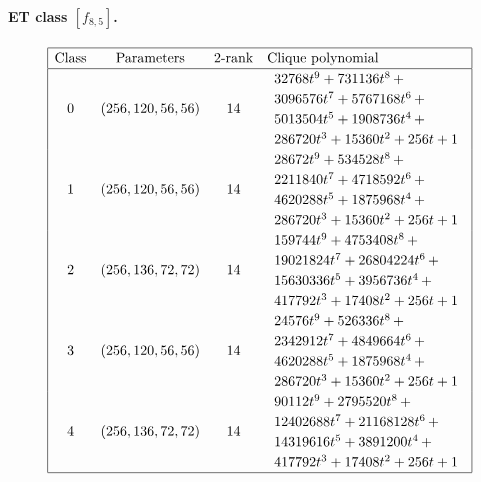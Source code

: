 \documentclass[12pt,a4paper]{article}
\begin{document}
\paragraph*{ET class $[f_{8,5}]$.}
%
\begin{table}[!bhpt] %
\small{}
\begin{align*}
\def\arraystretch{1.2}
\begin{array}{|cccl|}
\hline
\text{Class} &
\text{Parameters} &
\text{2-rank} &
\text{Clique polynomial}
\\
\hline
0 &
(256, 120, 56, 56) &
14 &
\begin{array}{l}
32768t^{9} + 731136t^{8}
\,+
\\
 3096576t^{7} + 5767168t^{6}
\,+
\\
 5013504t^{5} + 1908736t^{4}
\,+
\\
 286720t^{3} + 15360t^{2} + 256t + 1
\end{array}
\\
1 &
(256, 120, 56, 56) &
14 &
\begin{array}{l}
28672t^{9} + 534528t^{8}
\,+
\\
 2211840t^{7} + 4718592t^{6}
\,+
\\
 4620288t^{5} + 1875968t^{4}
\,+
\\
 286720t^{3} + 15360t^{2} + 256t + 1
\end{array}
\\
2 &
(256, 136, 72, 72) &
14 &
\begin{array}{l}
159744t^{9} + 4753408t^{8}
\,+
\\
 19021824t^{7} + 26804224t^{6}
\,+
\\
 15630336t^{5} + 3956736t^{4}
\,+
\\
 417792t^{3} + 17408t^{2} + 256t + 1
\end{array}
\\
3 &
(256, 120, 56, 56) &
14 &
\begin{array}{l}
24576t^{9} + 526336t^{8}
\,+
\\
 2342912t^{7} + 4849664t^{6}
\,+
\\
 4620288t^{5} + 1875968t^{4}
\,+
\\
 286720t^{3} + 15360t^{2} + 256t + 1
\end{array}
\\
4 &
(256, 136, 72, 72) &
14 &
\begin{array}{l}
90112t^{9} + 2795520t^{8}
\,+
\\
 12402688t^{7} + 21168128t^{6}
\,+
\\
 14319616t^{5} + 3891200t^{4}
\,+
\\
 417792t^{3} + 17408t^{2} + 256t + 1
\end{array}
\\
\hline
\end{array}
\end{align*}
\caption{$f_{8,5}$ extended Cayley classes (part 1)}
\label{tab-c8_5_EC_classes}
\end{table}
\end{document}
